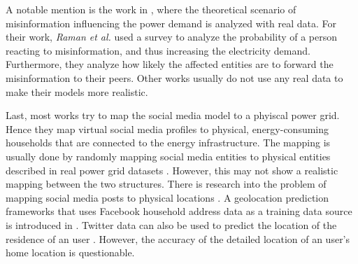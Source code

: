 A notable mention is the work in \cite{raman2020weaponizing},
where the theoretical scenario of misinformation influencing 
the power demand is analyzed with real data. For their work,
\textit{Raman et al.} used a survey to analyze the probability 
of a person reacting to misinformation,
and thus increasing the electricity demand.
Furthermore, they analyze how likely the affected entities 
are to forward the misinformation to their
peers. Other works usually do not use any real data to 
make their models more realistic.

Last, most works try to map the social media model to 
a phyiscal power grid. Hence they map virtual social 
media profiles to physical, energy-consuming 
households that are connected to the energy infrastructure.
The mapping is usually done by randomly mapping 
social media entities to physical entities described
in real power grid datasets \cite{nguyen2019vulnerability}
\cite{pan2017threat}. However, this may not show a realistic 
mapping between the two structures. There is 
research into the problem of mapping social media 
posts to physical locations \cite{jurgens2015geolocation}.
A geolocation prediction frameworks that 
uses Facebook household address data as a training data 
source is introduced in \cite{backstrom2010find}.
Twitter data can also be used to predict the location
of the residence of an user \cite{zheng2018survey}.
However, the accuracy of the detailed location of 
an user's home location is questionable.
